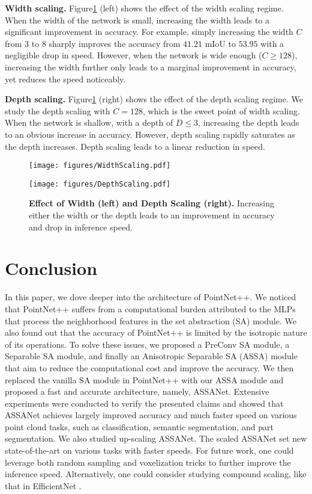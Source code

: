 \documentclass{article}
\newcommand{\figLabel}{Figure\xspace}
\newcommand{\mysection}[1]{\vspace{3pt}\noindent\textbf{#1.}}
\begin{document}
\mysection{Width scaling} \figLabel \ref{fig:scaling} (left) shows the effect of the width scaling regime. When the width of the network is small, increasing the width leads to a significant improvement in accuracy. For example, simply increasing the width $C$ from $3$ to $8$ sharply improves the accuracy from $41.21$ mIoU to $53.95$ with a negligible drop in speed. However, when the network is wide enough ($C \geq 128$), increasing the width further only leads to a marginal improvement in accuracy, yet reduces the speed noticeably.

\mysection{Depth scaling} \figLabel \ref{fig:scaling} (right) shows the effect of the depth scaling regime. We study the depth scaling with $C=128$, which is the sweet point of width scaling. When the network is shallow, with a depth of $D \leq 3$, increasing the depth leads to an obvious increase in accuracy. However, depth scaling rapidly saturates as the depth increases. Depth scaling leads to a linear reduction in speed. 

\begin{figure}[!htb]
    \centering
\begin{minipage}{.48\textwidth}
    \texttt{[image: figures/WidthScaling.pdf]}
\end{minipage}
\begin{minipage}{.48\textwidth}
      \texttt{[image: figures/DepthScaling.pdf]}
\end{minipage}
    \caption{\textbf{Effect of Width (left) and Depth Scaling (right).} Increasing either the width or the depth leads to an improvement in accuracy and drop in inference speed. }
    \label{fig:scaling}
\end{figure}
 \section{Conclusion}\label{sec:conclusion}
In this paper, we dove deeper into the architecture of PointNet++. We noticed that PointNet++ suffers from a computational burden attributed to the MLPs that process the neighborhood features in the set abstraction (SA) module. We also found out that the accuracy of PointNet++ is limited by the isotropic nature of its operations. To solve these issues, we proposed a PreConv SA module, a Separable SA module, and finally an Anisotropic Separable SA (ASSA) module that aim to reduce the computational cost and improve the accuracy. We then replaced the vanilla SA module in PointNet++ with our ASSA module and proposed a fast and accurate architecture, namely, ASSANet. Extensive experiments were conducted to verify the presented claims and showed that ASSANet achieves largely improved accuracy and much faster speed on various point cloud tasks, such as classification, semantic segmentation, and part segmentation. We also studied up-scaling ASSANet. The scaled ASSANet set new state-of-the-art on various tasks with faster speeds. For future work, one could leverage both random sampling \cite{Hu2020RandLANetES} and voxelization tricks \cite{Liu2019PointVoxelCF, Xu2020GridGCNFF} to further improve the inference speed. Alternatively, one could consider studying compound scaling, like that in EfficientNet \cite{Tan19EfficientNet}. 
 
\end{document}
